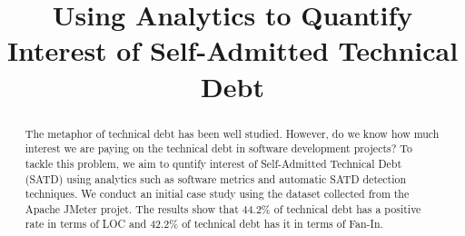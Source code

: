 \documentclass[conference]{IEEEtran}
\begin{document}
\title{Using Analytics to Quantify Interest of Self-Admitted Technical Debt}

\author{
}

\maketitle

\begin{abstract}
The metaphor of technical debt has been well studied. However, 
do we know how much interest we are paying on the technical debt in software development projects?
To tackle this problem, we aim to quntify interest of Self-Admitted Technical Debt (SATD) using analytics
such as software metrics and automatic SATD detection techniques. We conduct an initial case study using the dataset collected
from the Apache JMeter projet. The results show that 44.2\% of technical debt has a positive rate in terms of LOC and 42.2\% of technical debt has it in terms of Fan-In.
\end{abstract}

\IEEEpeerreviewmaketitle

\begin{comment}
2 tomato: let's finish results (how to show)
2 tomato: read related work to get knowledge and good motivation for RQ1 and RQ2.

- slide:
2 tomato (one topic of current)
2 tomato (one topic of current)
\end{comment}

%


\end{document}
